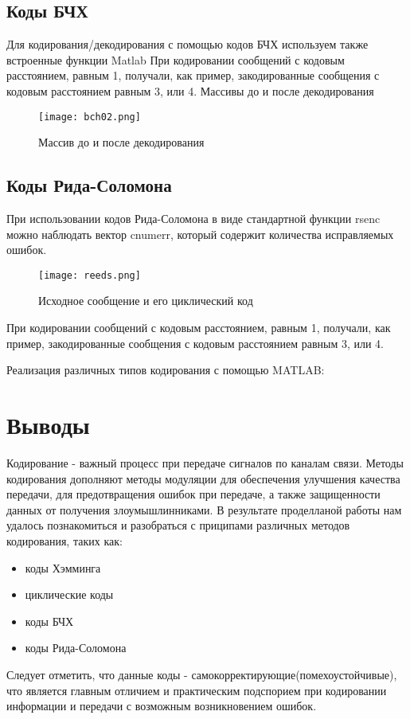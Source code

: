\subsection{Коды БЧХ}
Для кодирования/декодирования с помощью кодов БЧХ используем также встроенные функции Matlab
При кодировании сообщений с кодовым расстоянием, равным 1, получали, как пример, закодированные сообщения с кодовым расстоянием равным 3, или 4.
Массивы до и после декодирования
\begin{figure}[H]
    \begin{center}
        \texttt{[image: bch02.png]}
        \caption{Массив до и после декодирования} %
        \label{Bch_decode} %
    \end{center}
\end{figure}


\subsection{Коды Рида-Соломона}
При использовании кодов Рида-Соломона в виде стандартной функции rsenc можно наблюдать вектор cnumerr, который содержит количества исправляемых ошибок.

\begin{figure}[H]
    \begin{center}
        \texttt{[image: reeds.png]}
        \caption{Исходное сообщение и его циклический код} %
        \label{Cyclic_Code} %
    \end{center}
\end{figure}

При кодировании сообщений с кодовым расстоянием, равным 1, получали, как пример, закодированные сообщения с кодовым расстоянием равным 3, или 4.


Реализация различных типов кодирования с помощью MATLAB:



\section{Выводы}
Кодирование - важный процесс при передаче сигналов по каналам связи. Методы кодирования дополняют методы модуляции для обеспечения улучшения качества передачи, для предотвращения ошибок при передаче, а также защищенности данных от получения злоумышлинниками.
В результате проделланой работы нам удалось познакомиться и разобраться с приципами различных методов кодирования, таких как:
\begin{itemize}
	\item коды Хэмминга
	\item циклические коды
	\item коды БЧХ
	\item коды Рида-Соломона
\end{itemize}
Следует отметить, что данные коды - самокорректирующие(помехоустойчивые), что является главным отличием и практическим 
подспорием при кодировании информации и передачи с возможным возникновением ошибок.

